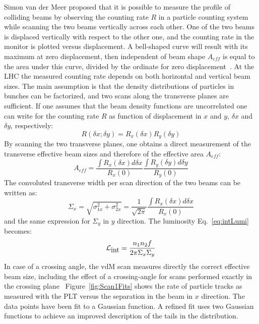 Simon van der Meer proposed that it is possible to measure the profile of colliding beams
by observing the counting rate $R$ in a particle counting system while scanning the two
beams vertically across each other. One of the two beams is displaced vertically with respect 
to the other one, and the counting rate in the monitor is plotted versus displacement.
A bell-shaped curve will result with its maximum at zero displacement, then independent  of beam shape $A_{eff}$ is equal to the area under this curve,
divided by the ordinate for zero displacement~\cite{vanderMeer:296752}.
%
At the LHC the measured counting rate
depends on both horizontal and vertical beam sizes. The main assumption is that the 
density distributions of particles in bunches can be factorized, and two scans along
the transverse planes are sufficient. If one assumes that the beam density functions 
are uncorrelated one can write for the counting rate $R$ as function of displacement
in $x$ and $y$, $\delta x$ and $\delta y$, respectively:
\begin{equation}
R(\delta x;\delta y) = R_x(\delta x) R_y(\delta y)
\end{equation}
By scanning the two transverse planes, one obtains a direct measurement of the transverse
effective beam sizes and therefore of the effective area $A_{eff}$:
\begin{equation}
A_{eff} = \frac{\int R_x(\delta x) d\delta x}{R_x(0)} \frac{\int R_y(\delta y) d\delta y}{R_y(0)}
\end{equation}
The convoluted transverse width per scan direction of the two beams can be written as:
\begin{equation}
\Sigma_x = \sqrt{\sigma_{1x}^2+\sigma_{2x}^2} = \frac{1}{\sqrt{2\pi}}\frac{\int R_x(\delta x) d\delta x}{R_x(0)} 
\end{equation}  
and the same expression for $\Sigma_y$ in $y$ direction. The luminosity Eq.~\ref{eq:intLumi} becomes:
\begin{equation}
{\cal L}_{\mbox{int}} = \frac{n_1 n_2 f}{2\pi \Sigma_x \Sigma_y} 
\end{equation}
In case of a crossing angle, the vdM scan measures directly the correct effective
beam size, including the effect of a crossing-angle for scans performed exactly in the
crossing plane~\cite{White:1308187}
%
Figure~\ref{fig:Scan1Fits} shows the rate of particle tracks as measured with the PLT versus
the separation in the beam in $x$ direction. The data points have been fit to a Gaussian 
function. A refined fit uses two Gaussian functions to achieve an improved description
of the tails in the distribution.

